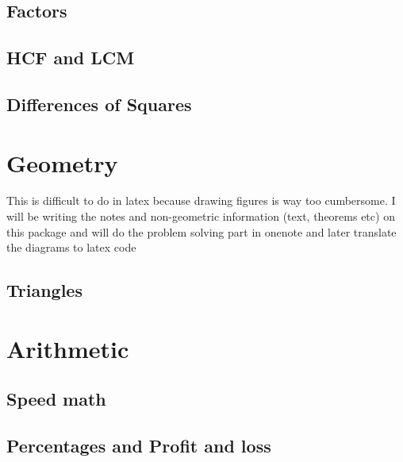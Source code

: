 \documentclass{book}
\begin{document}
\chapter{Factors}


\chapter{HCF and LCM}


\chapter{Differences of Squares}



\part{Geometry}
This is difficult to do in latex because drawing figures is way too cumbersome. I will be writing the notes and non-geometric information (text, theorems etc) on this package and will do the problem solving part in onenote and later translate the diagrams to latex code

\chapter{Triangles}



\part{Arithmetic}

\chapter{Speed math}


\chapter{Percentages and Profit and loss}

\end{document}
